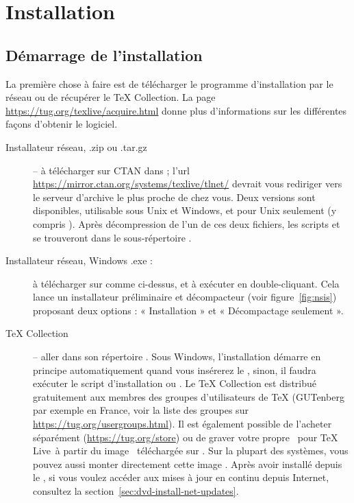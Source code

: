 \documentclass[german, english, french]{article}
\renewcommand{\TL}{\TeX{} Live\xspace}%
\renewcommand{\TK}{\TeX{} Collection\xspace}%
\begin{document}
\section{Installation}
\label{sec:install}

\subsection{Démarrage de l'installation}
\label{sec:inst_start}

La première chose à faire est de télécharger le programme d'installation par le
réseau ou de récupérer le \DVD{} \TK.  La page
\url{https://tug.org/texlive/acquire.html} donne plus d'informations sur les
différentes façons d'obtenir le logiciel.

\begin{description}
\item[Installateur réseau, .zip ou .tar.gz] -- à télécharger sur CTAN dans
   ; l'url
  \url{https://mirror.ctan.org/systems/texlive/tlnet/} devrait vous rediriger vers
  le serveur d'archive le plus proche de chez vous.  Deux versions sont
  disponibles,  utilisable sous Unix et Windows, et
   pour Unix seulement (y compris \MacOSX). Après
  décompression de l'un de ces deux fichiers, les scripts 
  et  se trouveront dans le sous-répertoire
  .

\item[Installateur réseau, Windows .exe :] à télécharger sur \CTAN{} comme
  ci-dessus, et à exécuter en double-cliquant. Cela lance un installateur
  préliminaire et décompacteur (voir figure~\ref{fig:nsis}) proposant deux
  options : « Installation » et « Décompactage seulement ».

\item[\DVD \TK{}] -- aller dans son répertoire .  Sous Windows,
  l'installation démarre en principe automatiquement quand vous insérerez le
  \DVD, sinon, il faudra exécuter le script d'installation 
  ou .  Le \DVD \TK{} est distribué gratuitement aux
  membres des groupes d'utilisateurs de \TeX{} (GUTenberg par exemple en France,
  voir la liste des groupes sur \url{https://tug.org/usergroups.html}). Il est
  également possible de l'acheter séparément (\url{https://tug.org/store}) ou de
  graver votre propre \DVD\ pour \TL\ à partir du image \ISO\ téléchargée sur
  \CTAN. Sur la plupart des systèmes, vous pouvez aussi monter directement cette
  image \ISO.  Après avoir installé depuis le \DVD{}, si vous voulez accéder aux
  mises à jour en continu depuis Internet, consultez la
  section~\ref{sec:dvd-install-net-updates}.
\end{description}
\end{document}
